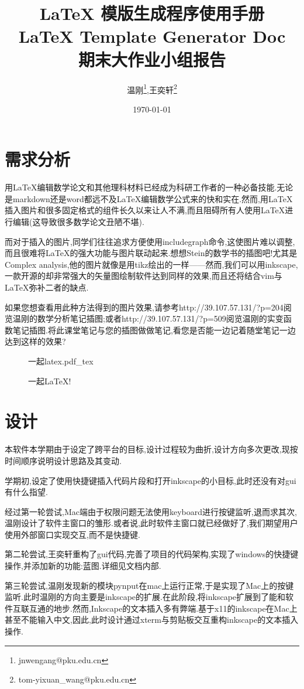 \documentclass[AutoFakeBold,letterpaper,12pt,hidelinks]{article}
\title{\LaTeX{} 模版生成程序使用手册\\\LaTeX{} Template Generator Doc\\期末大作业小组报告}
\newcommand{\incfig}[1]{%
    \def\svgwidth{\columnwidth}
    {#1.pdf_tex}
}
\begin{document}
\author{温刚\footnote{jnwengang@pku.edu.cn},王奕轩\footnote{tom-yixuan\_wang@pku.edu.cn}
  }
\date{\today}
\maketitle

\tableofcontents
\section{需求分析}%

用\LaTeX{}编辑数学论文和其他理科材料已经成为科研工作者的一种必备技能.无论是markdown还是word都远不及\LaTeX{}编辑数学公式来的快和实在.然而,用\LaTeX{}插入图片和很多固定格式的组件长久以来让人不满,而且阻碍所有人使用\LaTeX{}进行编辑(这导致很多数学论文丑陋不堪).

而对于插入的图片,同学们往往追求方便使用includegraph命令,这使图片难以调整,而且很难将\LaTeX{}的强大功能与图片联动起来.想想Stein的数学书的插图吧!尤其是Complex analysis,他的图片就像是用tikz绘出的一样——然而,我们可以用inkscape,一款开源的却非常强大的矢量图绘制软件达到同样的效果,而且还将结合vim与\LaTeX{}弥补二者的缺点.

如果您想查看用此种方法得到的图片效果,请参考http://39.107.57.131/?p=204阅览温刚的数学分析笔记插图;或者http://39.107.57.131/?p=509阅览温刚的实变函数笔记插图.将此课堂笔记与您的插图做做笔记,看您是否能一边记着随堂笔记一边达到这样的效果?


\begin{figure}[H]
    \centering
    \incfig{一起latex}
    \caption{一起\LaTeX{}!}
    \label{fig:一起latex}
\end{figure}

\section{设计}%

本软件本学期由于设定了跨平台的目标,设计过程较为曲折,设计方向多次更改,现按时间顺序说明设计思路及其变动.

学期初,设定了使用快捷键插入代码片段和打开inkscape的小目标,此时还没有对gui有什么指望.

经过第一轮尝试,Mac端由于权限问题无法使用keyboard进行按键监听,退而求其次,温刚设计了软件主窗口的雏形.或者说,此时软件主窗口就已经做好了,我们期望用户使用外部窗口实现交互,而不是快捷键.

第二轮尝试,王奕轩重构了gui代码,完善了项目的代码架构,实现了windows的快捷键操作,并添加新的功能:蓝图.详细见文档内部.

第三轮尝试,温刚发现新的模块pynput在mac上运行正常,于是实现了Mac上的按键监听.此时温刚的方向主要是inkscape的扩展.在此阶段,将inkscape扩展到了能和软件互联互通的地步.然而,Inkscape的文本插入多有弊端.基于x11的inkscape在Mac上甚至不能输入中文,因此,此时设计通过xterm与剪贴板交互重构inkscape的文本插入操作.
\end{document}
